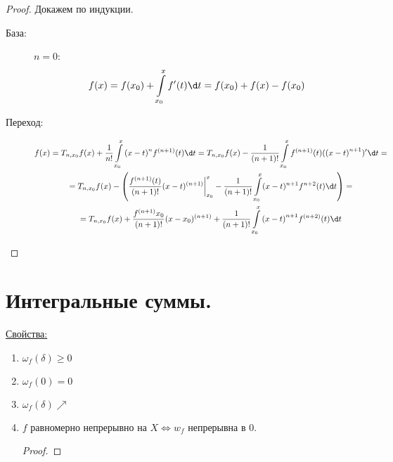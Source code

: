 \begin{proof}
	Докажем по индукции.
	
	\begin{description}
		\item[База:] $n = 0$:
		$$f(x) = f(x_0) + \int\limits_{x_0}^{x}f'(t)\d t = f(x_0) + f(x) - f(x_0)$$
		\item[Переход:] 
		\begin{gather*}
			f(x) = T_{n, x_0}f(x) + \frac{1}{n!}\int\limits_{x_0}^x{(x - t)}^nf^{(n + 1)}(t)\d t = T_{n, x_0}f(x) - \frac{1}{(n + 1)!}
			\int\limits_{x_0}^xf^{(n + 1)}(t)({(x - t)}^{n + 1})'\d t = \\
			= T_{n, x_0}f(x) - \left(\frac{f^{(n + 1)}(t)}{(n + 1)!}(x - t)^{(n + 1)}\biggr|_{x_0}^{x} - \frac{1}{(n + 1)!}\int\limits_{x_0}^x(x - t)^{n + 1}f^{n + 2}(t)\d t \right) = \\
			= T_{n, x_0}f(x) + \frac{f^{(n + 1)}x_0}{(n + 1)!}(x - x_0)^{(n + 1)} + \frac{1}{(n + 1)!}\int\limits_{x_0}^x{(x - t)}^{n + 1}f^{(n + 2)}(t)\d t
		\end{gather*}
	\end{description}
\end{proof}

\section{Интегральные суммы.}
\begin{Def}
	$f \colon X \ra Y$, $X, Y$ - метрические пространства.
	$\omega_f(\delta) = \sup{\rho_y(f(x_1), f(x_2)): \rho_x(x_1, x_2) < \delta$
	$\omega_f(\delta)$ - модуль непрерывности.
\end{Def}

\underline{Свойства:}
\begin{enumerate}
	\item $\omega_f(\delta) \ge 0$
	\item $\omega_f(0) = 0$
	\item $\omega_f(\delta)\nearrow$
	\item $f$ равномерно непрерывно на $X \Leftrightarrow w_f$ непрерывна в 0.
	\begin{proof}
		\Rightarrow
	\end{proof}
\end{enumerate}